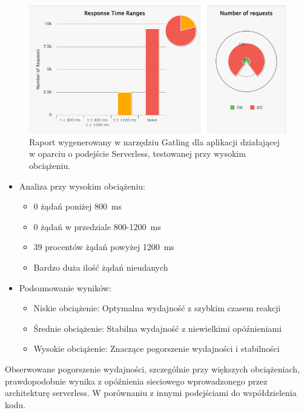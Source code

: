 \documentclass[runningheads,12pt]{llncs}
\begin{document}
\begin{figure}
    \includegraphics[width=\linewidth]{images/serverless-gatling-high-graph.jpg}
    \caption{Raport wygenerowany w narzędziu Gatling dla aplikacji działającej w oparciu o podejście Serverless, testowanej przy wysokim obciążeniu.} \label{fig3}
\end{figure}

\begin{itemize}
  \item Analiza przy wysokim obciążeniu:
  \begin{itemize}
    \item 0 żądań poniżej 800~ms
    \item 0 żądań w przedziale 800-1200~ms
    \item 39 procentów żądań powyżej 1200~ms
    \item Bardzo duża ilość żądań nieudanych
  \end{itemize}
\end{itemize}

\begin{itemize}
  \item Podsumowanie wyników:
  \begin{itemize}
    \item Niskie obciążenie: Optymalna wydajność z szybkim czasem reakcji
    \item Średnie obciążenie: Stabilna wydajność z niewielkimi opóźnieniami
    \item Wysokie obciążenie: Znaczące pogorszenie wydajności i stabilności
  \end{itemize}
\end{itemize}

Obserwowane pogorszenie wydajności, szczególnie przy większych obciążeniach, prawdopodobnie wynika z opóźnienia sieciowego wprowadzonego przez architekturę serverless. W porównaniu z innymi podejściami do współdzielenia kodu.
\end{document}
